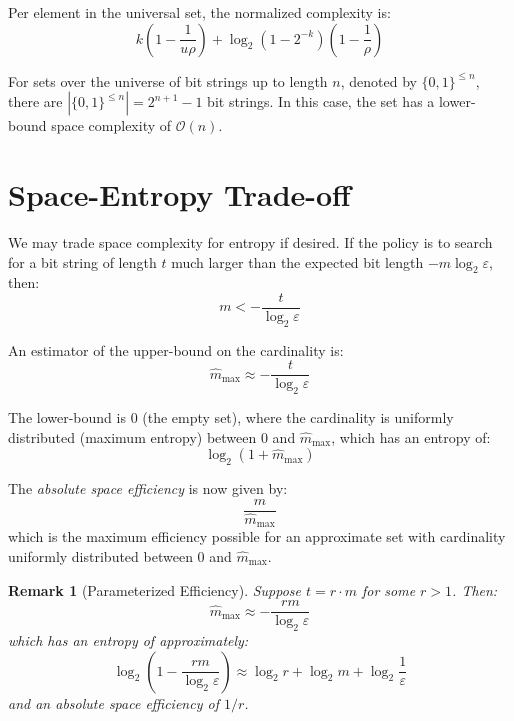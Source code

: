 \documentclass[11pt,a4paper]{article}
\newtheorem{remark}[theorem]{Remark}
\newcommand{\fprate}{\varepsilon}          %
\newcommand{\Card}[1]{\left|#1\right|}     %
\newcommand{\BitSet}{\{0,1\}}              %
\begin{document}
Per element in the universal set, the normalized complexity is:
\begin{equation}
    k\left(1 - \frac{1}{u \rho}\right) + \log_2\!\left(1 - 2^{-k}\right)\left(1 - \frac{1}{\rho}\right)
\end{equation}

For sets over the universe of bit strings up to length $n$, denoted by $\BitSet^{\leq n}$, there are $\Card{\BitSet^{\leq n}} = 2^{n+1} - 1$ bit strings. In this case, the set has a lower-bound space complexity of $\mathcal{O}(n)$.

\section{Space-Entropy Trade-off}

We may trade space complexity for entropy if desired. If the policy is to search for a bit string of length $t$ much larger than the expected bit length $-m \log_2 \fprate$, then:
\begin{equation}
    m < -\frac{t}{\log_2 \fprate}
\end{equation}

An estimator of the upper-bound on the cardinality is:
\begin{equation}
    \hat{m}_{\mathrm{max}} \approx -\frac{t}{\log_2 \fprate}
\end{equation}

The lower-bound is $0$ (the empty set), where the cardinality is uniformly distributed (maximum entropy) between $0$ and $\hat{m}_{\mathrm{max}}$, which has an entropy of:
\begin{equation}
    \log_2(1+\hat{m}_{\mathrm{max}})
\end{equation}

The \emph{absolute space efficiency} is now given by:
\begin{equation}
    \frac{m}{\hat{m}_{\mathrm{max}}}
\end{equation}
which is the maximum efficiency possible for an approximate set with cardinality uniformly distributed between $0$ and $\hat{m}_{\mathrm{max}}$.

\begin{remark}[Parameterized Efficiency]
Suppose $t = r \cdot m$ for some $r > 1$. Then:
\begin{equation}
    \hat{m}_{\mathrm{max}} \approx -\frac{r m}{\log_2 \fprate}
\end{equation}
which has an entropy of approximately:
\begin{equation}
    \log_2\!\left(1 -\frac{r m}{\log_2 \fprate}\right) \approx \log_2 r + \log_2 m + \log_2 \frac{1}{\fprate}
\end{equation}
and an absolute space efficiency of $1/r$.
\end{remark}
\end{document}
